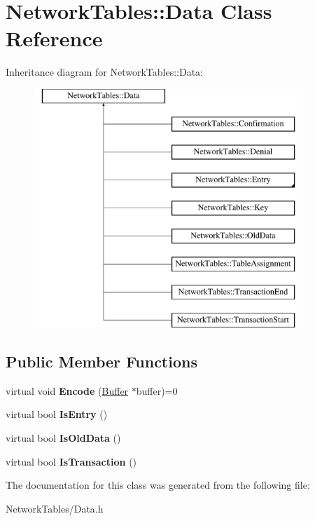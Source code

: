 \hypertarget{classNetworkTables_1_1Data}{
\section{NetworkTables::Data Class Reference}
\label{classNetworkTables_1_1Data}
}
Inheritance diagram for NetworkTables::Data:\begin{figure}[H]
\begin{center}
\leavevmode
\includegraphics[height=9.000000cm]{classNetworkTables_1_1Data}
\end{center}
\end{figure}
\subsection*{Public Member Functions}
\begin{DoxyCompactItemize}
\item 
\hypertarget{classNetworkTables_1_1Data_af211c0de543b7fb0c3919c33b798310b}{
virtual void {\bfseries Encode} (\hyperlink{classNetworkTables_1_1Buffer}{Buffer} $\ast$buffer)=0}
\label{classNetworkTables_1_1Data_af211c0de543b7fb0c3919c33b798310b}

\item 
\hypertarget{classNetworkTables_1_1Data_aa1c34d56261fc7ed0600ebe1542465cb}{
virtual bool {\bfseries IsEntry} ()}
\label{classNetworkTables_1_1Data_aa1c34d56261fc7ed0600ebe1542465cb}

\item 
\hypertarget{classNetworkTables_1_1Data_a408117b86f3dc7df04f5e2c35e8d5fb1}{
virtual bool {\bfseries IsOldData} ()}
\label{classNetworkTables_1_1Data_a408117b86f3dc7df04f5e2c35e8d5fb1}

\item 
\hypertarget{classNetworkTables_1_1Data_aab9aad0ae7e3a90d7d13583b24630d84}{
virtual bool {\bfseries IsTransaction} ()}
\label{classNetworkTables_1_1Data_aab9aad0ae7e3a90d7d13583b24630d84}

\end{DoxyCompactItemize}


The documentation for this class was generated from the following file:\begin{DoxyCompactItemize}
\item 
NetworkTables/Data.h\end{DoxyCompactItemize}
